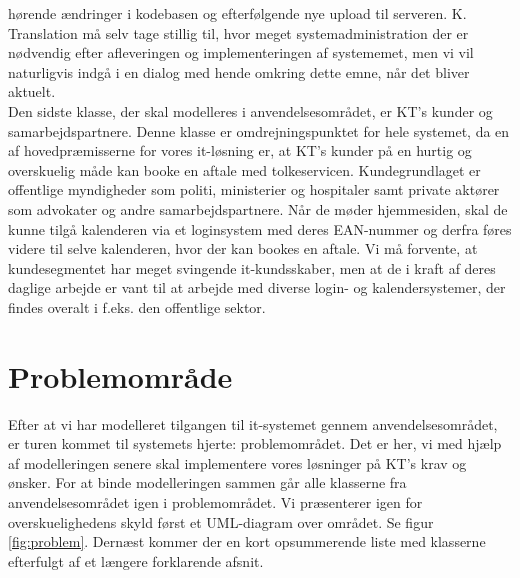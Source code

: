\documentclass[12pt]{article}   %
\begin{document}
hørende ændringer i kodebasen og efterfølgende nye upload til serveren. K.
Translation må selv tage stillig til, hvor meget systemadministration der er
nødvendig efter afleveringen og implementeringen af systememet, men vi vil
naturligvis indgå i en dialog med hende omkring dette emne, når det bliver
aktuelt. \\
Den sidste klasse, der skal modelleres i anvendelsesområdet, er KT's kunder og
samarbejdspartnere. Denne klasse er omdrejningspunktet for hele systemet, da
en af hovedpræmisserne for vores it-løsning er, at KT's kunder på en hurtig og
overskuelig måde kan booke en aftale med tolkeservicen. Kundegrundlaget er  
offentlige myndigheder som politi, ministerier og hospitaler samt private
aktører som advokater og andre samarbejdspartnere. Når de møder hjemmesiden, skal
de kunne tilgå kalenderen via et loginsystem med deres EAN-nummer og derfra
føres videre til selve kalenderen, hvor der kan bookes en aftale. Vi må
forvente, at kundesegmentet har meget svingende it-kundsskaber, men at de i
kraft af deres daglige arbejde er vant til at arbejde med diverse login- og 
kalendersystemer, der findes overalt i f.eks. den offentlige sektor. \\

\section{Problemområde}
Efter at vi har modelleret tilgangen til it-systemet gennem
anvendelsesområdet, er turen kommet til systemets hjerte: problemområdet. Det
er her, vi med hjælp af modelleringen senere skal implementere vores
løsninger på KT's krav og ønsker. For at binde modelleringen sammen går alle 
klasserne fra anvendelsesområdet igen i problemområdet. Vi præsenterer igen for
overskuelighedens skyld først et UML-diagram over området. Se figur 
\ref{fig:problem}. Dernæst kommer der en kort opsummerende liste med klasserne 
efterfulgt af et længere forklarende afsnit.  
\end{document}
